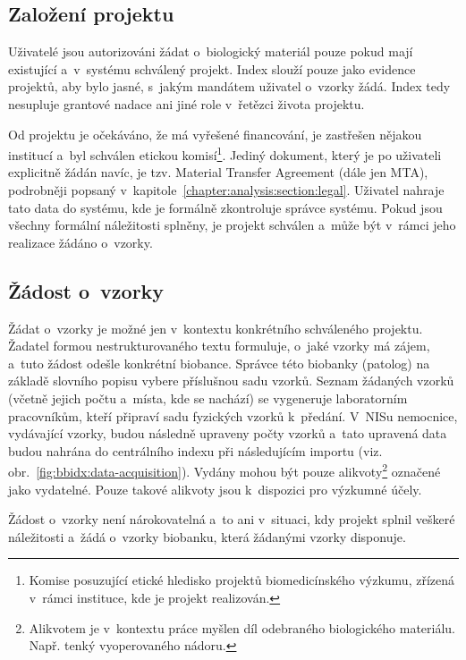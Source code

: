 \documentclass[11pt, draft, oneside]{fithesis2}
\begin{document}
\subsection{Založení projektu}
Uživatelé jsou autorizováni žádat o~biologický materiál pouze pokud mají existující a~v~systému schválený projekt. Index slouží pouze jako evidence projektů, aby bylo jasné, s~jakým mandátem uživatel o~vzorky žádá. Index tedy nesupluje grantové nadace ani jiné role v~řetězci života projektu. 

Od projektu je očekáváno, že má vyřešené financování, je zastřešen nějakou institucí a~byl schválen etickou komisí\footnote{Komise posuzující etické hledisko projektů biomedicínského výzkumu, zřízená v~rámci instituce, kde je projekt realizován.}. Jediný dokument, který je po uživateli explicitně žádán navíc, je tzv. Material Transfer Agreement (dále jen MTA), podrobněji popsaný v~kapitole~\ref{chapter:analysis:section:legal}. Uživatel nahraje tato data do systému, kde je formálně zkontroluje správce systému. Pokud jsou všechny formální náležitosti splněny, je projekt schválen a~může být v~rámci jeho realizace žádáno o~vzorky.

\subsection{Žádost o~vzorky}
Žádat o~vzorky je možné jen v~kontextu konkrétního schváleného projektu. Žadatel formou nestrukturovaného textu formuluje, o~jaké vzorky má zájem, a~tuto žádost odešle konkrétní biobance. Správce této biobanky (patolog) na základě slovního popisu vybere příslušnou sadu vzorků. Seznam žádaných vzorků (včetně jejich počtu a~místa, kde se nachází) se vygeneruje laboratorním pracovníkům, kteří připraví sadu fyzických vzorků k~předání. V~NISu nemocnice, vydávající vzorky, budou následně upraveny počty vzorků a~tato upravená data budou nahrána do centrálního indexu při následujícím importu (viz. obr.~\ref{fig:bbidx:data-acquisition}). Vydány mohou být pouze alikvoty\footnote{Alikvotem je v~kontextu práce myšlen díl odebraného biologického materiálu. Např. tenký  vyoperovaného nádoru.} označené jako vydatelné. Pouze takové alikvoty jsou k~dispozici pro výzkumné účely.

Žádost o~vzorky není nárokovatelná a~to ani v~situaci, kdy projekt splnil veškeré náležitosti a~žádá o~vzorky biobanku, která žádanými vzorky disponuje.
\end{document}
